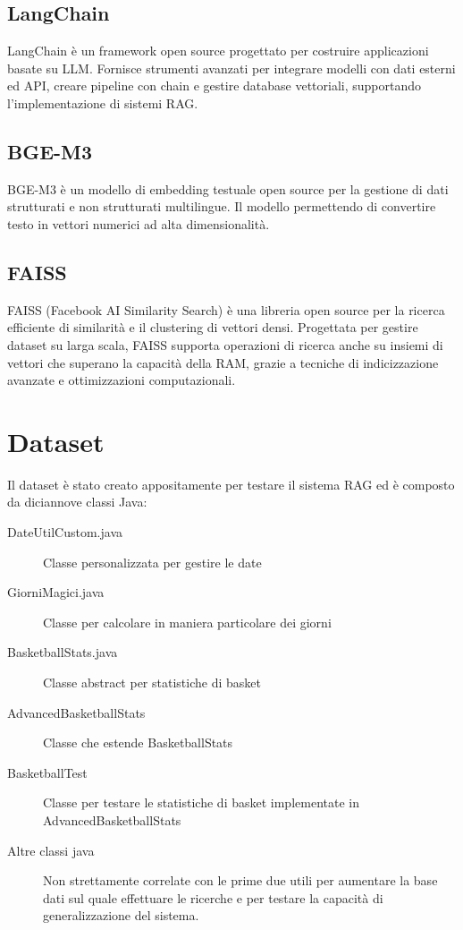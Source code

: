 \documentclass[12pt,a4paper,openright,twoside]{book}
\begin{document}
\subsection{LangChain}
LangChain \cite{langchain} è un framework open source progettato per costruire applicazioni basate su LLM.
Fornisce strumenti avanzati per integrare modelli con dati esterni ed API, creare pipeline con chain
e gestire database vettoriali, supportando l'implementazione di sistemi RAG.

\subsection{BGE-M3}
BGE-M3 \cite{bge-m3} è un modello di embedding testuale open source per la gestione di dati strutturati e non strutturati multilingue.
Il modello permettendo di convertire testo in vettori numerici ad alta dimensionalità.

\subsection{FAISS}
FAISS (Facebook AI Similarity Search) \cite{faiss} è una libreria open source per la ricerca efficiente di similarità e il clustering di vettori densi.
Progettata per gestire dataset su larga scala, FAISS supporta operazioni di ricerca anche su insiemi di vettori che superano la capacità della RAM, grazie a tecniche di indicizzazione avanzate e ottimizzazioni computazionali.

\section{Dataset}
Il dataset è stato creato appositamente per testare il sistema RAG ed è composto da diciannove classi Java:

\begin{description}
    \item[DateUtilCustom.java] Classe personalizzata per gestire le date
    \item[GiorniMagici.java] Classe per calcolare in maniera particolare dei giorni
    \item[BasketballStats.java] Classe abstract per statistiche di basket
    \item[AdvancedBasketballStats] Classe che estende BasketballStats
    \item[BasketballTest] Classe per testare le statistiche di basket implementate in AdvancedBasketballStats
    \item[Altre classi java] Non strettamente correlate con le prime due utili per aumentare la base dati sul quale effettuare le ricerche e per testare la capacità di generalizzazione del sistema.
\end{description}
\end{document}
